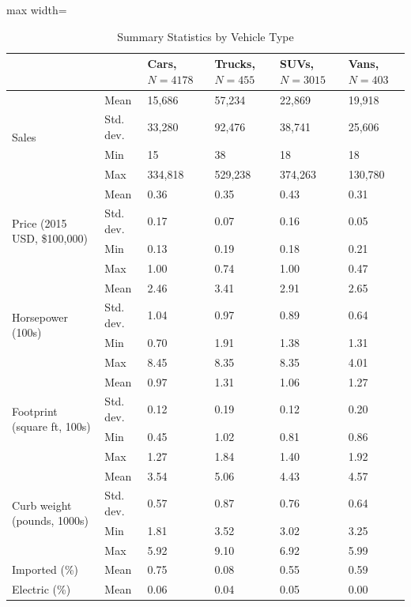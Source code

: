 \begin{table}[htbp]
\centering
\caption{Summary Statistics by Vehicle Type}
\label{tab:summary_by_type}
\footnotesize
\setlength{\tabcolsep}{6pt}
\renewcommand{\arraystretch}{1.15}
\begin{adjustbox}{max width=\textwidth}
\begin{tabular}{llllll}
\toprule
 &  & Cars, $N = 4178$ & Trucks, $N = 455$ & SUVs, $N = 3015$ & Vans, $N = 403$ \\
\midrule
\multirow{4}{*}{Sales} & Mean & 15,686 & 57,234 & 22,869 & 19,918 \\
  & Std. dev. & 33,280 & 92,476 & 38,741 & 25,606 \\
  & Min & 15 & 38 & 18 & 18 \\
  & Max & 334,818 & 529,238 & 374,263 & 130,780 \\
\midrule
\multirow{4}{*}{Price (2015 USD, \$100,000)} & Mean & 0.36 & 0.35 & 0.43 & 0.31 \\
  & Std. dev. & 0.17 & 0.07 & 0.16 & 0.05 \\
  & Min & 0.13 & 0.19 & 0.18 & 0.21 \\
  & Max & 1.00 & 0.74 & 1.00 & 0.47 \\
\midrule
\multirow{4}{*}{Horsepower (100s)} & Mean & 2.46 & 3.41 & 2.91 & 2.65 \\
  & Std. dev. & 1.04 & 0.97 & 0.89 & 0.64 \\
  & Min & 0.70 & 1.91 & 1.38 & 1.31 \\
  & Max & 8.45 & 8.35 & 8.35 & 4.01 \\
\midrule
\multirow{4}{*}{Footprint (square ft, 100s)} & Mean & 0.97 & 1.31 & 1.06 & 1.27 \\
  & Std. dev. & 0.12 & 0.19 & 0.12 & 0.20 \\
  & Min & 0.45 & 1.02 & 0.81 & 0.86 \\
  & Max & 1.27 & 1.84 & 1.40 & 1.92 \\
\midrule
\multirow{4}{*}{Curb weight (pounds, 1000s)} & Mean & 3.54 & 5.06 & 4.43 & 4.57 \\
  & Std. dev. & 0.57 & 0.87 & 0.76 & 0.64 \\
  & Min & 1.81 & 3.52 & 3.02 & 3.25 \\
  & Max & 5.92 & 9.10 & 6.92 & 5.99 \\
\midrule
\multirow{1}{*}{Imported (\%)} & Mean & 0.75 & 0.08 & 0.55 & 0.59 \\
\midrule
\multirow{1}{*}{Electric (\%)} & Mean & 0.06 & 0.04 & 0.05 & 0.00 \\
\bottomrule
\end{tabular}
\end{adjustbox}
\end{table}
